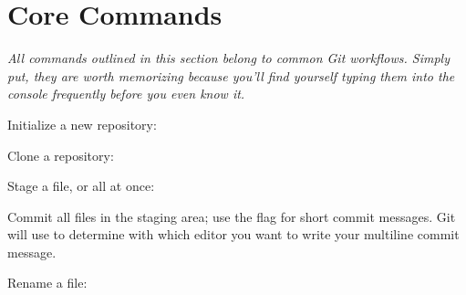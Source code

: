 \section{Core Commands}\label{git-core-commands}

\begin{flushleft}
	\emph{All commands outlined in this section belong to common Git workflows.
		Simply put, they are worth memorizing because you'll find yourself typing them
		into the console frequently before you even know it.}
\end{flushleft}

\begin{flushleft}
	Initialize a new repository:
\end{flushleft}

\begin{flushleft}
\end{flushleft}

\begin{flushleft}
	Clone a repository:
\end{flushleft}

\begin{flushleft}
\end{flushleft}

\begin{flushleft}
	Stage a file, or all at once:
\end{flushleft}

\begin{flushleft}
\end{flushleft}

\begin{flushleft}
	Commit all files in the staging area; use the  flag for short commit messages.
	Git will use  to determine with which editor you want to write your
	multiline commit message.
\end{flushleft}

\begin{flushleft}
\end{flushleft}

\begin{flushleft}
	Rename a file:
\end{flushleft}

\begin{flushleft}
\end{flushleft}

